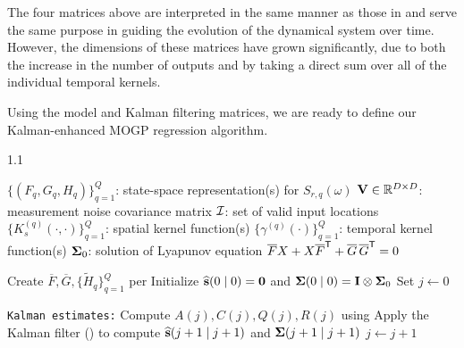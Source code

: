 \documentclass[10pt]{article}
\numberwithin{equation}{section}
\begin{document}
The four matrices above are interpreted in the same manner as those in  and serve the same purpose in guiding the evolution of the dynamical system over time. However, the dimensions of these matrices have grown significantly, due to both the increase in the number of outputs and by taking a direct sum over all of the individual temporal kernels. 

Using the model and Kalman filtering matrices, we are ready to define our Kalman-enhanced MOGP regression algorithm.
\begin{algorithm}
    \caption{Kalman-based MOGP regression on $\calI$ at query time $t \in \bbR^{+}$}
    \label{alg:kalman-MOGP-regression}

    \begin{spacing}{1.1}
    \begin{algorithmic}[1]
        \Require 
            \Statex \hspace{\algorithmicindent} $\{(F_{q},G_{q},H_{q})\}_{q=1}^{Q}$: state-space representation(s) for $S_{r, q}(\omega)$
            \Statex \hspace{\algorithmicindent} $\mathbf{V} \in \mathbb{R}^{D \times D}$: measurement noise covariance matrix
            \Statex \hspace{\algorithmicindent} $\calI$: set of valid input locations
            \Statex \hspace{\algorithmicindent} $\{K_s^{(q)}(\cdot,\cdot)\}_{q=1}^{Q}$: spatial kernel function(s)
            \Statex \hspace{\algorithmicindent} $\{\gamma^{(q)}(\cdot)\}_{q=1}^{Q}$: temporal kernel function(s)
            \Statex \hspace{\algorithmicindent} $\bm{\Sigma}_0$: solution of Lyapunov equation $\overline{F}X+X\overline{F}^{\scriptstyle{\mathsf{T}}}+\overline{G}\,\overline{G}^{\scriptstyle{\mathsf{T}}}=0$

        \State Create $\overline{F}, \overline{G}, \{\widetilde{H}_{q}\}_{q=1}^{Q}$ per 
        \State Initialize $\widehat{\mathbf{s}}(0\mid 0) = \mathbf{0}$ and $\bm{\Sigma}(0\mid 0)=\mathbf{I}\otimes\bm{\Sigma}_0$
        \State Set $j \gets 0$

        \Statex \texttt{Kalman estimates:}
            \State Compute $A(j), C(j), Q(j), R(j)$ using 
            \State Apply the Kalman filter () to compute $\widehat{\mathbf{s}}(j+1 \mid j+1)$ and $\bm{\Sigma}(j+1 \mid j+1)$
            \State $j \gets j+1$
        \EndWhile 


\end{algorithmic}
\end{spacing}
\end{algorithm}
\end{document}
